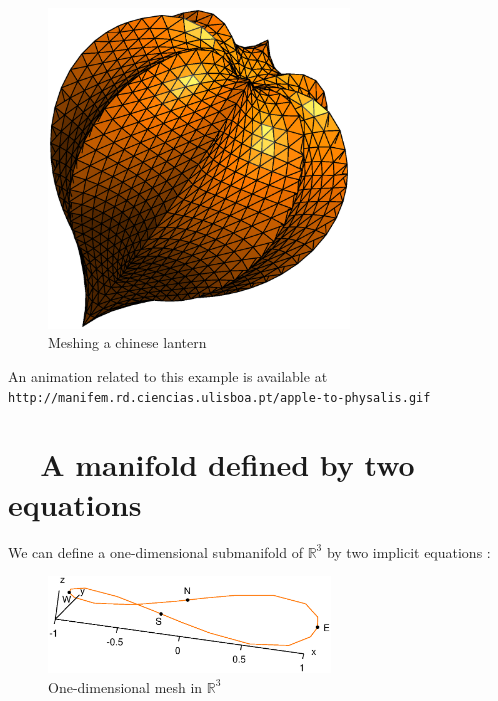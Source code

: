 \begin{figure}[ht] \centering
  \includegraphics[width=80mm]{fisalis}
  \caption{Meshing a chinese lantern}
  \label{\numb section 2.\numb fig 16}
\end{figure}

An animation related to this example is available at\hfil\break
{\small\tt http://manifem.rd.ciencias.ulisboa.pt/apple-to-physalis.gif}


\section{~~A manifold defined by two equations}\label{\numb section 2.\numb parag 14}

We can define a one-dimensional submanifold of $ \mathbb{R}^3 $ by two implicit equations :
\medskip

\begin{figure}[ht] \centering
  \includegraphics[width=75mm]{circle-3d}
  \caption{One-dimensional mesh in $ {\mathbb R}^3 $}
  \label{\numb section 2.\numb fig 17}
\end{figure}

